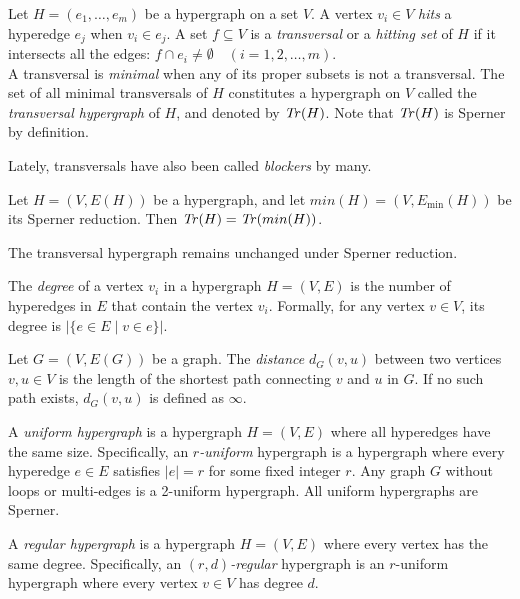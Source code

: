 \begin{definition}
Let $H=(e_1,\dots,e_m)$ be a hypergraph on a set $V$. A vertex $v_i\in V$ \emph{hits} a hyperedge $e_j$ when $v_i\in e_j$. A set $f\subseteq V$ is a \emph{transversal} or a \emph{hitting set} of $H$ if it intersects all the edges: $f\cap e_i\neq\emptyset\quad(i=1,2,\dots,m)$.\\
A transversal is \emph{minimal} when any of its proper subsets is not a transversal. The set of all minimal transversals of $H$ constitutes a hypergraph on $V$ called the \emph{transversal hypergraph} of $H$, and denoted by $\mathit{Tr}(H)$. Note that $\mathit{Tr}(H)$ is Sperner by definition.
\end{definition}

Lately, transversals have also been called \emph{blockers} by many.

\begin{proposition}
Let $H=(V,E(H))$ be a hypergraph, and let $min(H)=(V,E_{\min}(H))$ be its Sperner reduction. Then $\mathit{Tr}(H)=\mathit{Tr}(min(H))$.
\end{proposition}

\cite{Ber87} The transversal hypergraph remains unchanged under Sperner reduction.

\begin{definition}
The \emph{degree} of a vertex $v_i$ in a hypergraph $H=(V,E)$ is the number of hyperedges in $E$ that contain the vertex $v_i$. Formally, for any vertex $v\in V$, its degree is $|\{e\in E\mid v\in e\}|$.
\end{definition}

\begin{definition}\label{def:distance}
Let $G=(V,E(G))$ be a graph. The \emph{distance} $d_G(v,u)$ between two vertices $v,u\in V$ is the length of the shortest path connecting $v$ and $u$ in $G$. If no such path exists, $d_G(v,u)$ is defined as $\infty$.
\end{definition}

\begin{definition}
A \emph{uniform hypergraph} is a hypergraph $H=(V,E)$ where all hyperedges have the same size. Specifically, an \emph{$r$-uniform} hypergraph is a hypergraph where every hyperedge $e\in E$ satisfies $|e|=r$ for some fixed integer $r$. Any graph $G$ without loops or multi-edges is a 2-uniform hypergraph. All uniform hypergraphs are Sperner.
\end{definition}

\begin{definition}
A \emph{regular hypergraph} is a hypergraph $H=(V,E)$ where every vertex has the same degree. Specifically, an \emph{$(r,d)$-regular} hypergraph is an $r$-uniform hypergraph where every vertex $v\in V$ has degree $d$.
\end{definition}

